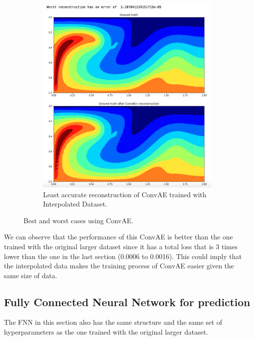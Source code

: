 \begin{figure}[H]
\begin{subfigure}{0.45\textwidth}
    \includegraphics[width=\textwidth]{figures/mantle_convection_images/larger_dataset_interpolated/ConvAE_Worst.png}
    \caption{Least accurate reconstruction of ConvAE trained with Interpolated Dataset.}
\end{subfigure}
\caption{Best and worst cases using ConvAE.}
\label{figure:ConvAE_interpolated_best_worst}
\end{figure}

We can observe that the performance of this ConvAE is better than the one trained with the original larger dataset since it has a total loss that is 3 times lower than the one in the last section (0.0006 to 0.0016). This could imply that the interpolated data makes the training process of ConvAE easier given the same size of data. 


\subsection{Fully Connected Neural Network for prediction}
\label{sec:mc_interpolated_fnn}

The FNN in this section also has the same structure and the same set of hyperparameters as the one trained with the original larger dataset.

